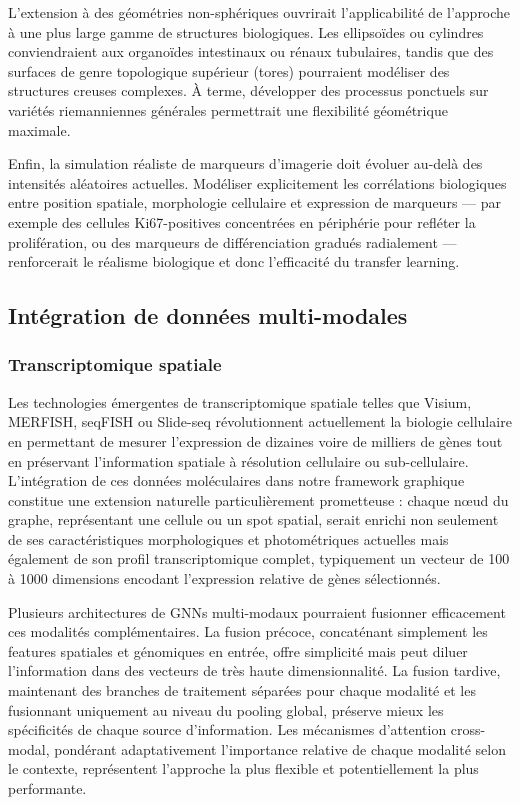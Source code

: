 L'extension à des géométries non-sphériques ouvrirait l'applicabilité de l'approche à une plus large gamme de structures biologiques. Les ellipsoïdes ou cylindres conviendraient aux organoïdes intestinaux ou rénaux tubulaires, tandis que des surfaces de genre topologique supérieur (tores) pourraient modéliser des structures creuses complexes. À terme, développer des processus ponctuels sur variétés riemanniennes générales permettrait une flexibilité géométrique maximale.

Enfin, la simulation réaliste de marqueurs d'imagerie doit évoluer au-delà des intensités aléatoires actuelles. Modéliser explicitement les corrélations biologiques entre position spatiale, morphologie cellulaire et expression de marqueurs — par exemple des cellules Ki67-positives concentrées en périphérie pour refléter la prolifération, ou des marqueurs de différenciation gradués radialement — renforcerait le réalisme biologique et donc l'efficacité du transfer learning.

\subsection{Intégration de données multi-modales}

\subsubsection{Transcriptomique spatiale}

Les technologies émergentes de transcriptomique spatiale telles que Visium, MERFISH, seqFISH ou Slide-seq révolutionnent actuellement la biologie cellulaire en permettant de mesurer l'expression de dizaines voire de milliers de gènes tout en préservant l'information spatiale à résolution cellulaire ou sub-cellulaire. L'intégration de ces données moléculaires dans notre framework graphique constitue une extension naturelle particulièrement prometteuse : chaque nœud du graphe, représentant une cellule ou un spot spatial, serait enrichi non seulement de ses caractéristiques morphologiques et photométriques actuelles mais également de son profil transcriptomique complet, typiquement un vecteur de 100 à 1000 dimensions encodant l'expression relative de gènes sélectionnés.

Plusieurs architectures de GNNs multi-modaux pourraient fusionner efficacement ces modalités complémentaires. La fusion précoce, concaténant simplement les features spatiales et génomiques en entrée, offre simplicité mais peut diluer l'information dans des vecteurs de très haute dimensionnalité. La fusion tardive, maintenant des branches de traitement séparées pour chaque modalité et les fusionnant uniquement au niveau du pooling global, préserve mieux les spécificités de chaque source d'information. Les mécanismes d'attention cross-modal, pondérant adaptativement l'importance relative de chaque modalité selon le contexte, représentent l'approche la plus flexible et potentiellement la plus performante.

